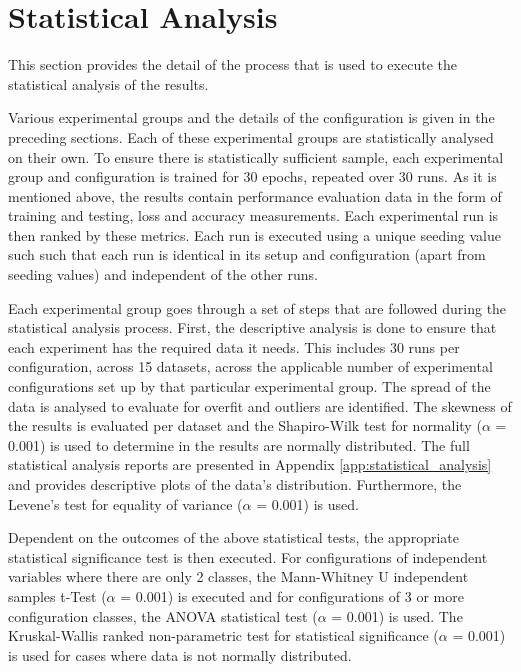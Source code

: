 \section{Statistical Analysis}
\label{sec:methodology:statistical_analysis}

This section provides the detail of the process that is used to execute the statistical analysis of the results.

Various experimental groups and the details of the configuration is given in the preceding sections. Each of these experimental groups are statistically analysed on their own. To ensure there is statistically sufficient sample, each experimental group and configuration is trained for 30 epochs, repeated over 30 runs. As it is mentioned above, the results contain performance evaluation data in the form of training and testing, loss and accuracy measurements. Each experimental run is then ranked by these metrics. Each run is executed using a unique seeding value such such that each run is identical in its setup and configuration (apart from seeding values) and independent of the other runs.

Each experimental group goes through a set of steps that are followed during the statistical analysis process. First, the descriptive analysis is done to ensure that each experiment has the required data it needs. This includes 30 runs per configuration, across 15 datasets, across the applicable number of experimental configurations set up by that particular experimental group. The spread of the data is analysed to evaluate for overfit and outliers are identified. The skewness of the results is evaluated per dataset and the Shapiro-Wilk test for normality ($\alpha$ = 0.001) is used to determine in the results are normally distributed. The full statistical analysis reports are presented in Appendix \ref{app:statistical_analysis} and provides descriptive plots of the data's distribution. Furthermore, the Levene's test for equality of variance ($\alpha$ = 0.001) is used.

Dependent on the outcomes of the above statistical tests, the appropriate statistical significance test is then executed. For configurations of independent variables where there are only 2 classes, the Mann-Whitney U independent samples t-Test ($\alpha$ = 0.001) is executed and for configurations of 3 or more configuration classes, the \ac{ANOVA} statistical test ($\alpha$ = 0.001) is used. The Kruskal-Wallis ranked non-parametric test for statistical significance ($\alpha$ = 0.001) is used for cases where data is not normally distributed.

